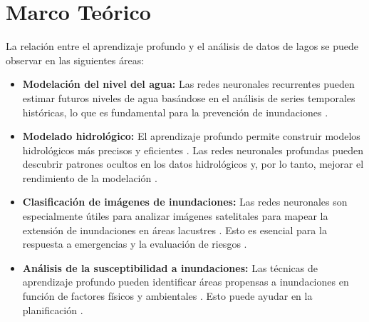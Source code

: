 \documentclass[12pt]{article}
\begin{document}
\section{Marco Te\'orico}
La relación entre el aprendizaje profundo y el análisis de datos de lagos se puede observar en las siguientes áreas:
\begin{itemize}[label=\textbullet]
    \item \textbf{Modelación del nivel del agua:} Las redes neuronales recurrentes pueden estimar futuros niveles de agua basándose en el análisis de series temporales históricas, lo que es fundamental para la prevención de inundaciones \cite{ayus2023}.
    \item \textbf{Modelado hidrológico:} El aprendizaje profundo permite construir modelos hidrológicos más precisos y eficientes \cite{bentivoglio2022}. Las redes neuronales profundas pueden descubrir patrones ocultos en los datos hidrológicos y, por lo tanto, mejorar el rendimiento de la modelación \cite{bentivoglio2022}.
    \item \textbf{Clasificación de imágenes de inundaciones:} Las redes neuronales son especialmente útiles para analizar imágenes satelitales para mapear la extensión de inundaciones en áreas lacustres \cite{bentivoglio2022}. Esto es esencial para la respuesta a emergencias y la evaluación de riesgos \cite{bentivoglio2022}.
    \item \textbf{Análisis de la susceptibilidad a inundaciones:} Las técnicas de aprendizaje profundo pueden identificar áreas propensas a inundaciones en función de factores físicos y ambientales \cite{bentivoglio2022}. Esto puede ayudar en la planificación \cite{bentivoglio2022}.
\end{itemize}

\printbibliography
\end{document}
